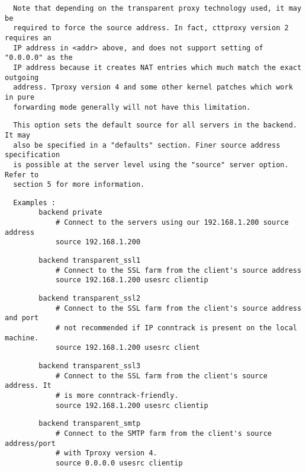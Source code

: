 \begin{verbatim}
  Note that depending on the transparent proxy technology used, it may be
  required to force the source address. In fact, cttproxy version 2 requires an
  IP address in <addr> above, and does not support setting of "0.0.0.0" as the
  IP address because it creates NAT entries which much match the exact outgoing
  address. Tproxy version 4 and some other kernel patches which work in pure
  forwarding mode generally will not have this limitation.
\end{verbatim}

\begin{verbatim}
  This option sets the default source for all servers in the backend. It may
  also be specified in a "defaults" section. Finer source address specification
  is possible at the server level using the "source" server option. Refer to
  section 5 for more information.
\end{verbatim}

\begin{verbatim}
  Examples :
        backend private
            # Connect to the servers using our 192.168.1.200 source address
            source 192.168.1.200
\end{verbatim}

\begin{verbatim}
        backend transparent_ssl1
            # Connect to the SSL farm from the client's source address
            source 192.168.1.200 usesrc clientip
\end{verbatim}

\begin{verbatim}
        backend transparent_ssl2
            # Connect to the SSL farm from the client's source address and port
            # not recommended if IP conntrack is present on the local machine.
            source 192.168.1.200 usesrc client
\end{verbatim}

\begin{verbatim}
        backend transparent_ssl3
            # Connect to the SSL farm from the client's source address. It
            # is more conntrack-friendly.
            source 192.168.1.200 usesrc clientip
\end{verbatim}

\begin{verbatim}
        backend transparent_smtp
            # Connect to the SMTP farm from the client's source address/port
            # with Tproxy version 4.
            source 0.0.0.0 usesrc clientip
\end{verbatim}

